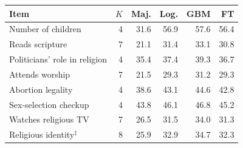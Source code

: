 \begin{tabular}{@{}lrrrrr@{}}
\toprule
\textbf{Item} & $K$ & \textbf{Maj.} & \textbf{Log.} & \textbf{GBM} & \textbf{FT} \\
\midrule
Number of children & 4 & 31.6 & 56.9 & 57.6 & 56.4 \\
Reads scripture & 7 & 21.1 & 31.4 & 33.1 & 30.8 \\
Politicians' role in religion & 4 & 35.4 & 37.4 & 39.3 & 36.7 \\
Attends worship & 7 & 21.5 & 29.3 & 31.2 & 29.3 \\
Abortion legality & 4 & 38.6 & 43.1 & 44.6 & 42.8 \\
Sex-selection checkup & 4 & 43.8 & 46.1 & 46.8 & 45.2 \\
Watches religious TV & 7 & 26.5 & 31.5 & 34.0 & 31.3 \\
Religious identity$^\ddagger$ & 8 & 25.9 & 32.9 & 34.7 & 32.3 \\
\bottomrule
\end{tabular}